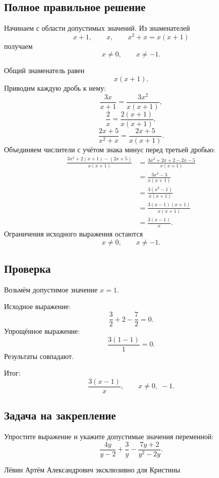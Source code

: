 \documentclass[12pt,a4paper]{article}
\begin{document}
\subsection*{Полное правильное решение}
Начинаем с области допустимых значений. Из знаменателей
\[
x+1,\qquad x,\qquad x^2+x=x(x+1)
\]
получаем
\[
x\ne0,
\qquad
x\ne-1.
\]

Общий знаменатель равен
\[
x(x+1).
\]
Приводим каждую дробь к нему:
\[
\frac{3x}{x+1}
=
\frac{3x^2}{x(x+1)},
\]
\[
\frac{2}{x}
=
\frac{2(x+1)}{x(x+1)},
\]
\[
\frac{2x+5}{x^2+x}
=
\frac{2x+5}{x(x+1)}.
\]
Объединяем числители с учётом знака минус перед третьей дробью:
\begin{align*}
\frac{3x^2+2(x+1)-(2x+5)}{x(x+1)}
&=
\frac{3x^2+2x+2-2x-5}{x(x+1)}\\
&=
\frac{3x^2-3}{x(x+1)}\\
&=
\frac{3(x^2-1)}{x(x+1)}\\
&=
\frac{3(x-1)(x+1)}{x(x+1)}\\
&=
\frac{3(x-1)}{x}.
\end{align*}
Ограничения исходного выражения остаются
\[
x\ne0,
\qquad
x\ne-1.
\]

\subsection*{Проверка}
Возьмём допустимое значение $x=1$.

Исходное выражение:
\[
\frac{3}{2}+2-\frac{7}{2}=0.
\]
Упрощённое выражение:
\[
\frac{3(1-1)}{1}=0.
\]
Результаты совпадают.

\textcolor{teal!60!black}{Итог:}
\[
\boxed{\displaystyle \frac{3(x-1)}{x}},
\qquad
x\ne0,\;-1.
\]

\subsection*{Задача на закрепление}
Упростите выражение и укажите допустимые значения переменной:
\[
\frac{4y}{y-2}
+
\frac{3}{y}
-
\frac{7y+2}{y^2-2y}.
\]

\vfill
\begin{center}
\small Лёвин Артём Александрович эксклюзивно для Кристины
\end{center}

\end{document}
